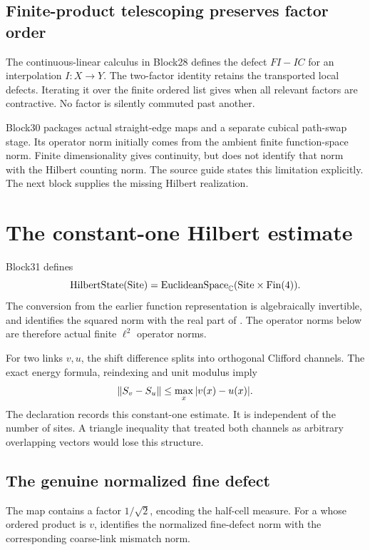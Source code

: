 \subsection{Finite-product telescoping preserves factor order}

The continuous-linear calculus in Block28 defines the defect \(FI-IC\) for an interpolation \(I:X\to Y\). The two-factor identity retains the transported local defects. Iterating it over the finite ordered list gives  when all relevant factors are contractive. No factor is silently commuted past another.

Block30 packages actual straight-edge maps and a separate cubical path-swap stage. Its operator norm initially comes from the ambient finite function-space norm. Finite dimensionality gives continuity, but does not identify that norm with the Hilbert counting norm. The source guide states this limitation explicitly. The next block supplies the missing Hilbert realization.

\section{The constant-one Hilbert estimate}

Block31 defines
\[
 \operatorname{HilbertState}(\mathrm{Site})
 =\operatorname{EuclideanSpace}_{\mathbb C}(\mathrm{Site}\times\mathrm{Fin}(4)).
\]
The conversion from the earlier function representation is algebraically invertible, and  identifies the squared norm with the real part of . The operator norms below are therefore actual finite \(\ell^2\) operator norms.

For two links \(v,u\), the shift difference splits into orthogonal Clifford channels. The exact energy formula, reindexing and unit modulus imply
\[
 \left\lVert S_v-S_u\right\rVert\le\max_x|v(x)-u(x)|.
\]
The declaration  records this constant-one estimate. It is independent of the number of sites. A triangle inequality that treated both channels as arbitrary overlapping vectors would lose this structure.

\subsection{The genuine normalized fine defect}

The map  contains a factor \(1/\sqrt2\), encoding the half-cell measure. For a  whose ordered product is \(v\),  identifies the normalized fine-defect norm with the corresponding coarse-link mismatch norm.

